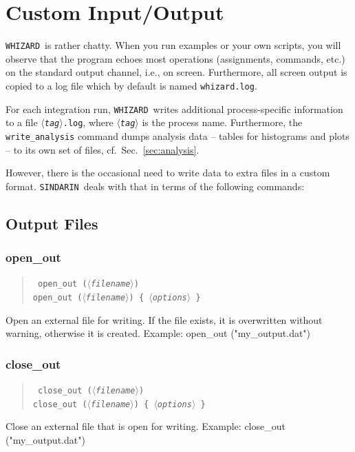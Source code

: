 \documentclass[12pt]{book}
\newenvironment{code}%
  {\begingroup\footnotesize
   \quote
   \Verbatim}%
  {\endVerbatim
   \endquote
   \endgroup\noindent}
\newenvironment{syntax}%
  {\begin{quote}
   \begin{flushleft}\tt}%
  {\end{flushleft}
   \end{quote}}
\newcommand{\var}[1]{$\langle$\textit{#1}$\rangle$}
\newcommand{\ttt}[1]{\texttt{#1}}
\newcommand{\whizard}{\ttt{WHIZARD}}
\newcommand{\sindarin}{\ttt{SINDARIN}}
\begin{document}
\section{Custom Input/Output}
\label{sec:I/O}

\whizard\ is rather chatty.  When you run examples or your own scripts, you
will observe that the program echoes most operations (assignments, commands,
etc.) on the standard output channel, i.e., on screen.  Furthermore, all
screen output is copied to a log file which by default is named
\ttt{whizard.log}.

For each integration run, \whizard\ writes additional process-specific
information to a file \ttt{\var{tag}.log}, where \ttt{\var{tag}} is the
process name.  Furthermore, the \ttt{write\_analysis} command dumps analysis
data -- tables for histograms and plots -- to its own set of files, cf.\
Sec.~\ref{sec:analysis}.

However, there is the occasional need to write data to extra files in a custom
format.  \sindarin\ deals with that in terms of the following commands:

\subsection{Output Files}

\subsubsection{open\_out}
\begin{syntax}
open\_out (\var{filename}) \\
open\_out (\var{filename}) \{ \var{options} \}
\end{syntax}
Open an external file for writing.  If the file exists, it is overwritten
without warning, otherwise it is created.  Example:
\begin{code}
open_out ("my_output.dat")
\end{code}


\subsubsection{close\_out}
\begin{syntax}
close\_out (\var{filename}) \\
close\_out (\var{filename}) \{ \var{options} \}
\end{syntax}
Close an external file that is open for writing.  Example:
\begin{code}
close_out ("my_output.dat")
\end{code}
\end{document}
